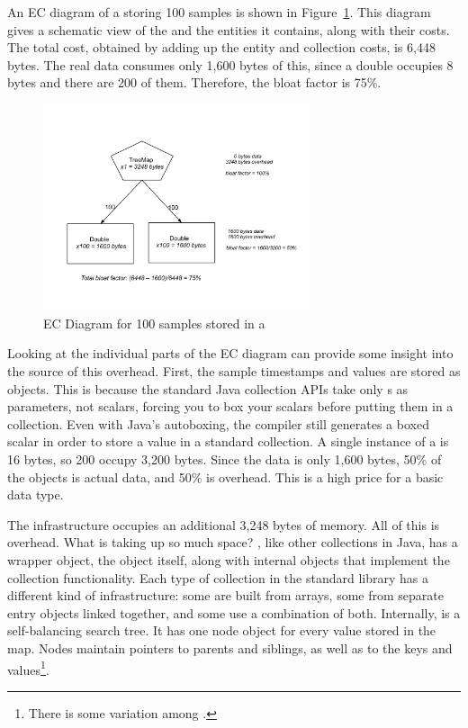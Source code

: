 An EC diagram of a  storing 100 samples is shown in
Figure~\ref{fig:content-schematic-treemap-doubles}.  This diagram gives a
schematic view of the  and the entities it contains, along with
their costs. The total cost, obtained by adding up the entity and collection
costs, is 6,448 bytes. The real data consumes only 1,600 bytes of this, since a
double occupies 8 bytes and there are 200 of them. Therefore, the bloat factor
is 75\%.

\begin{figure}
  \centering
  \includegraphics[width=0.7\textwidth]{part1/Figures/memoryhealth/treemap-doubles}
  \caption{EC Diagram for 100 samples stored in a }
  \label{fig:content-schematic-treemap-doubles}
\end{figure} 
 
Looking at the individual parts of the EC diagram can provide some insight into
the source of this overhead. First, the sample timestamps and values are stored
as  objects. This is because the standard Java collection APIs take
only s as parameters, not scalars, forcing you to box your scalars
before putting them in a collection. Even with Java's autoboxing, the compiler
still generates a boxed scalar in order to store a value in a standard
collection.  A single instance of a  is 16 bytes, so 200
 occupy 3,200 bytes. Since the data is only 1,600 bytes, 50\% of
the  objects is actual data, and 50\% is overhead. This is a high
price for a basic data type.

The  infrastructure occupies an additional 3,248 bytes of
memory. All of this is overhead. What is taking up so much space? 
, like other collections in Java, has a wrapper object, the
 object itself, along with internal objects that implement
the collection functionality. Each type of collection in the standard library
has a different kind of infrastructure: some are built from arrays, some from
separate entry objects linked together, and some use a combination of both.
Internally,  is a self-balancing search tree. It has one
node object for every value stored in the map. Nodes maintain pointers to
parents and siblings, as well as to the keys and values\footnote{There is some
variation among \jres.}.

